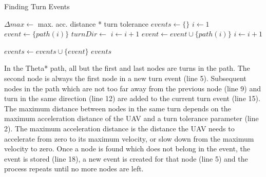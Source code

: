 \begin{algorithm}
\caption{Finding Turn Events}
\label{alg:corners}
\begin{algorithmic}[1]
  \State $\Delta max \leftarrow$ max. acc. distance * turn tolerance
  \State $events \leftarrow \{\}$ 
  \State $i \leftarrow 1$ 
   
  	\State $event \leftarrow \{ path(i) \}$ 
  	\State $turnDir \leftarrow$  
    	\State $i \leftarrow  i + 1$
    		\Break {}
	\EndIf
		\Break {}
	\EndIf
	\State $event \leftarrow event \cup \{ path(i) \}$
	\State $i \leftarrow  i + 1$
	
    	\EndWhile
    	
    	\State $events \leftarrow events \cup \{ event \}$
  \EndWhile
\Return $events$
\EndFunction
\end{algorithmic}
\end{algorithm}
In the Theta* path, all but the first and last nodes are turns in the path. The second node is always the first node in a new turn event (line 5). Subsequent nodes in the path which are not too far away from the previous node (line 9) and turn in the same direction (line 12) are added to the current turn event (line 15). The maximum distance between nodes in the same turn depends on the maximum acceleration distance of the UAV and a turn tolerance parameter (line 2). The maximum acceleration distance is the distance the UAV needs to accelerate from zero to its maximum velocity, or slow down from the maximum velocity to zero. Once a node is found which does not belong in the event, the event is stored (line 18), a new event is created for that node (line 5) and the process repeats until no more nodes are left.
